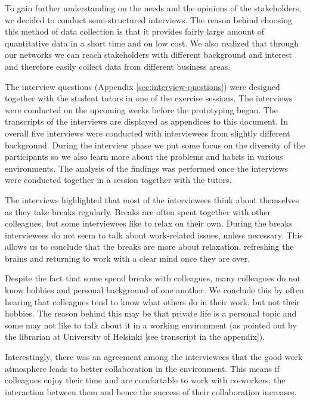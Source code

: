 To gain further understanding on the needs and the opinions of the stakeholders, we decided to conduct semi-structured interviews. The reason behind choosing this method of data collection is that it provides fairly large amount of quantitative data in a short time and on low cost. We also realized that through our networks we can reach stakeholders with different background and interest and therefore easily collect data from different business areas. 

The interview questions (Appendix \ref{sec:interview-questions}) were designed together with the student tutors in one of the exercise sessions. The interviews were conducted on the upcoming weeks before the prototyping began. The transcripts of the interviews are displayed as appendices to this document. In overall five interviews were conducted with interviewees from slightly different background. During the interview phase we put some focus on the diversity of the participants so we also learn more about the problems and habits in various environments. The analysis of the findings was performed once the interviews were conducted together in a session together with the tutors.

The interviews highlighted that most of the interviewees think about themselves as they take breaks regularly. Breaks are often spent together with other colleagues, but some interviewees like to relax on their own. During the breaks interviewees do not seem to talk about work-related issues, unless necessary. This allows us to conclude that the breaks are more about relaxation, refreshing the brains and returning to work with a clear mind once they are over. 

Despite the fact that some spend breaks with colleagues, many colleagues do not know hobbies and personal background of one another. We conclude this by often hearing that colleagues tend to know what others do in their work, but not their hobbies. The reason behind this may be that private life is a personal topic and some may not like to talk about it in a working environment (as pointed out by the librarian at University of Helsinki [see transcript in the appendix]). 

Interestingly, there was an agreement among the interviewees that the good work atmosphere leads to better collaboration in the environment. This means if colleagues enjoy their time and are comfortable to work with co-workers, the interaction between them and hence the success of their collaboration increases. 